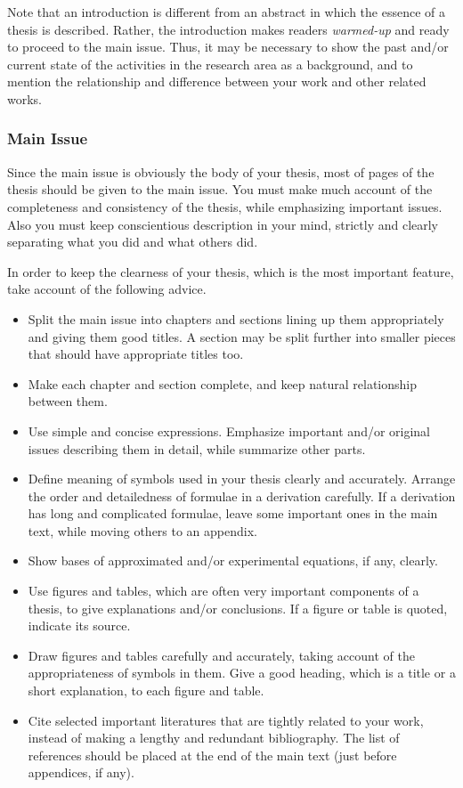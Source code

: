 \documentclass[english]{kuisthesis}
\begin{document}
Note that an introduction is different from an abstract in which the essence
of a thesis is described.  Rather, the introduction makes readers {\em
warmed-up} and ready to proceed to the main issue.  Thus, it may be
necessary to show the past and/or current state of the activities in the
research area as a background, and to mention the relationship and
difference between your work and other related works.

\subsubsection{Main Issue}\label{subsubsec-main}
Since the main issue is obviously the body of your thesis, most of pages of
the thesis should be given to the main issue.  You must make much account of
the completeness and consistency of the thesis, while emphasizing important
issues.  Also you must keep conscientious description in your mind, strictly
and clearly separating what you did and what others did.

In order to keep the clearness of your thesis, which is the most important
feature, take account of the following advice.
\begin{itemize}%
\item
Split the main issue into chapters and sections lining up them appropriately
and giving them good titles.  A section may be split further into smaller
pieces that should have appropriate titles too.
\item
Make each chapter and section complete, and keep natural relationship
between them.
\item
Use simple and concise expressions.  Emphasize important and/or original
issues describing them in detail, while summarize other parts.
\item
Define meaning of symbols used in your thesis clearly and accurately.
Arrange the order and detailedness of formulae in a derivation carefully.
If a derivation has long and complicated formulae, leave some important ones
in the main text, while moving others to an appendix.
\item
Show bases of approximated and/or experimental equations, if any, clearly.
\item
Use figures and tables, which are often very important components of a
thesis, to give explanations and/or conclusions.  If a figure or table is
quoted, indicate its source.
\item
Draw figures and tables carefully and accurately, taking account of the
appropriateness of symbols in them.  Give a good heading, which is a title
or a short explanation, to each figure and table.
\item
Cite selected important literatures that are tightly related to your work,
instead of making a lengthy and redundant bibliography.  The list of
references should be placed at the end of the main text (just before
appendices, if any).
\end{itemize}%
\end{document}
